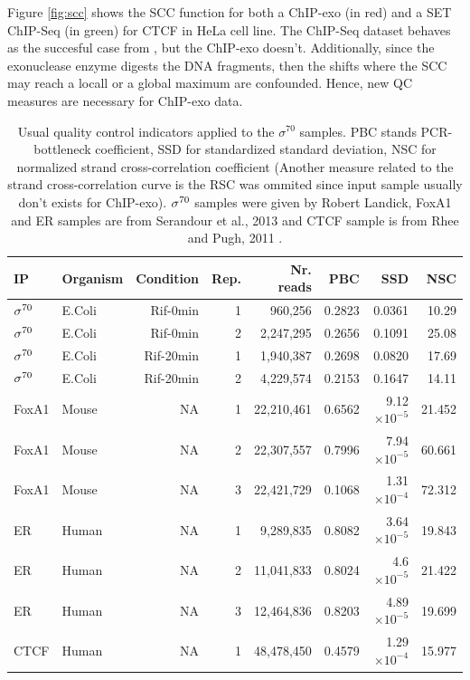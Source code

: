 \documentclass[11pt]{article}\usepackage[]{graphicx}\usepackage[]{color}
\begin{document}
Figure \ref{fig:scc} shows the SCC function for both a ChIP-exo (in
red) and a SET ChIP-Seq (in green) for CTCF in HeLa cell line. The
ChIP-Seq dataset behaves as the succesful case from \cite{encode_qc},
but the ChIP-exo doesn't. Additionally, since the exonuclease enzyme
digests the DNA fragments, then the shifts where the SCC may reach a
locall or a global maximum are confounded. Hence, new QC measures are
necessary for ChIP-exo data.

\begin{table}[H]
  \centering
  \caption{Usual quality control indicators applied to the $\sigma^{70}$ samples. PBC stands PCR-bottleneck coefficient, SSD for standardized standard deviation, NSC for normalized strand cross-correlation coefficient (Another measure related to the strand cross-correlation curve is the RSC was ommited since input sample usually don't exists for ChIP-exo). $\sigma^{70}$ samples were given by Robert Landick, FoxA1 and ER samples are from Serandour et al., 2013 \cite{exoillumina} and CTCF sample is from Rhee and Pugh, 2011 \cite{exo1}.}

\begin{tabular}{l|l|r|r|r|r|r|r}
\hline\hline
IP & Organism  &Condition & Rep. & Nr. reads & PBC & SSD &  NSC  \\
\hline\hline
$\sigma^{70}$ & E.Coli & Rif-0min & 1 & 960,256 & 0.2823 & 0.0361 &  10.29 \\
\hline
$\sigma^{70}$ &  E.Coli & Rif-0min & 2 & 2,247,295 & 0.2656 & 0.1091  &  25.08  \\
\hline
$\sigma^{70}$ &  E.Coli & Rif-20min & 1 & 1,940,387 & 0.2698 & 0.0820  & 17.69  \\
\hline
$\sigma^{70}$ &  E.Coli & Rif-20min & 2 & 4,229,574 & 0.2153 & 0.1647  &  14.11 \\
\hline
FoxA1 &  Mouse &  NA & 1 & 22,210,461 & 0.6562 & 9.12 $\times 10^{-5}$ & 21.452 \\
\hline
FoxA1 &  Mouse &  NA & 2 & 22,307,557 & 0.7996 & 7.94 $\times 10^{-5}$ & 60.661 \\
\hline
FoxA1 &  Mouse &  NA & 3 & 22,421,729 & 0.1068 & 1.31 $\times 10^{-4}$ & 72.312 \\
\hline
ER & Human & NA & 1 & 9,289,835 & 0.8082 & 3.64 $\times 10^{-5}$ & 19.843 \\
\hline
ER & Human & NA & 2 & 11,041,833 & 0.8024 & 4.6 $\times 10^{-5}$ & 21.422 \\
\hline
ER & Human & NA & 3 & 12,464,836 & 0.8203 & 4.89 $\times 10^{-5}$ & 19.699 \\
\hline
CTCF & Human & NA & 1 &   48,478,450 & 0.4579 & 1.29 $\times 10^{-4}$ & 15.977 \\
\hline
\end{tabular}  
  \label{tab:qcbase}
\end{table}
\end{document}
